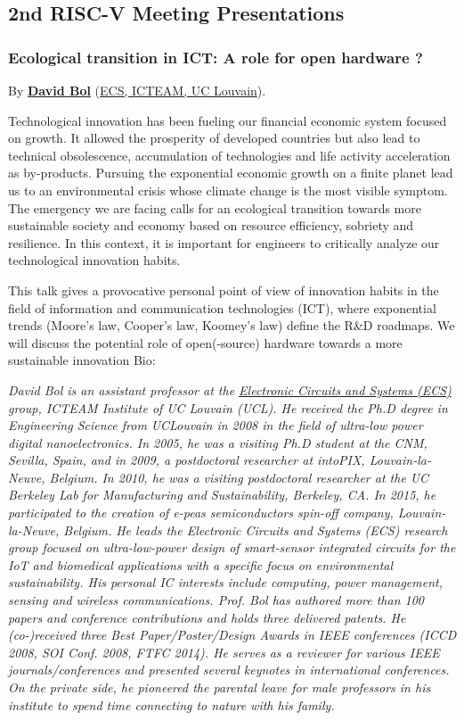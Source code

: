 \documentclass[a4paper, 10pt]{article}
\begin{document}
{\subsection{2nd RISC-V Meeting Presentations}
\label{sec:org76e4864}
\subsubsection{Ecological transition in ICT: A role for open hardware ?}
\label{sec:org6c5e3e2}
By \textbf{\href{https://perso.uclouvain.be/david.bol}{David Bol}}
(\href{https://uclouvain.be/en/research-institutes/icteam/ecs.html}{ECS,
ICTEAM, UC Louvain}).

Technological innovation has been fueling our financial economic system
focused on growth. It allowed the prosperity of developed countries but
also lead to technical obsolescence, accumulation of technologies and
life activity acceleration as by-products. Pursuing the exponential
economic growth on a finite planet lead us to an environmental crisis
whose climate change is the most visible symptom. The emergency we are
facing calls for an ecological transition towards more sustainable
society and economy based on resource efficiency, sobriety and
resilience. In this context, it is important for engineers to critically
analyze our technological innovation habits.

This talk gives a provocative personal point of view of innovation
habits in the field of information and communication technologies (ICT),
where exponential trends (Moore's law, Cooper's law, Koomey's law)
define the R\&D roadmaps. We will discuss the potential role of
open(-source) hardware towards a more sustainable innovation Bio:

\emph{\footnotesize David Bol is an assistant professor at the \href{https://uclouvain.be/en/research-institutes/icteam/ecs.html}{Electronic Circuits and Systems (ECS)} group, ICTEAM Institute of UC Louvain (UCL). He received the Ph.D degree in Engineering Science from UCLouvain in 2008 in the field of ultra-low power digital nanoelectronics. In 2005, he was a visiting Ph.D student at the CNM, Sevilla, Spain, and in 2009, a postdoctoral researcher at intoPIX, Louvain-la-Neuve, Belgium.  In 2010, he was a visiting postdoctoral researcher at the UC Berkeley Lab for Manufacturing and Sustainability, Berkeley, CA. In 2015, he participated to the creation of e-peas semiconductors spin-off company, Louvain-la-Neuve, Belgium. He leads the Electronic Circuits and Systems (ECS) research group focused on ultra-low-power design of smart-sensor integrated circuits for the IoT and biomedical applications with a specific focus on environmental sustainability. His personal IC interests include computing, power management, sensing and wireless communications. Prof. Bol has authored more than 100 papers and conference contributions and holds three delivered patents. He (co-)received three Best Paper/Poster/Design Awards in IEEE conferences (ICCD 2008, SOI Conf. 2008, FTFC 2014). He serves as a reviewer for various IEEE journals/conferences and presented several keynotes in international conferences. On the private side, he pioneered the parental leave for male professors in his institute to spend time connecting to nature with his family.}

}
\end{document}
